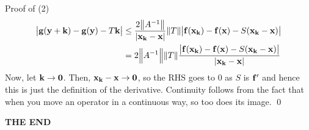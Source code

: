 \begin{nblank}{Proof of (2)}
    \begin{align*}
        \abs{\mathbf{g}(\mathbf{y} + \mathbf{k}) - \mathbf{g}(\mathbf{y}) - T\mathbf{k}} &\leq \frac{2\norm{A^{-1}}}{\abs{\mathbf{x}_{\mathbf{k}} - \mathbf{x}}}\norm{T}\abs{\mathbf{f}(\mathbf{x}_{\mathbf{k}}) - \mathbf{f}(\mathbf{x}) - S(\mathbf{x}_{\mathbf{k}} - \mathbf{x})} 
        \\ &= 2\norm{A^{-1}}\norm{T}\frac{\abs{\mathbf{f}(\mathbf{x}_{\mathbf{k}}) - \mathbf{f}(\mathbf{x}) - S(\mathbf{x}_{\mathbf{k}} - \mathbf{x})}}{\abs{\mathbf{x}_{\mathbf{k}} - \mathbf{x}}}
    \end{align*}
    Now, let $\mathbf{k} \rightarrow \mathbf{0}$. Then, $\mathbf{x}_{\mathbf{k}} - \mathbf{x} \rightarrow \mathbf{0}$, so the RHS goes to $0$ as $S$ is $\mathbf{f}'$ and hence this is just the definition of the derivative. Continuity follows from the fact that when you move an operator in a continuous way, so too does its image. \qed
\end{nblank}
\begin{center}
    \textbf{THE END}
\end{center}
